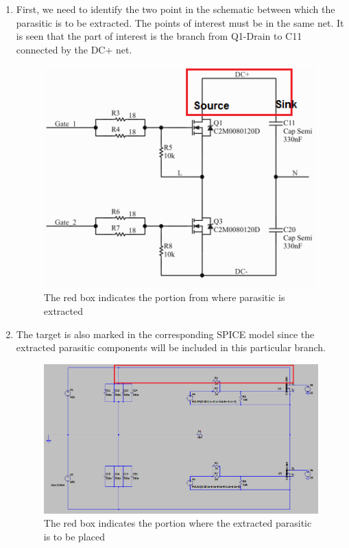 \begin{enumerate}
\item  First, we need to identify the two point in the schematic between which the parasitic is to be extracted. The points of interest must be in the same net. It is seen that the part of interest is the branch from Q1-Drain to C11 connected by the DC+ net.

\begin{figure} [H]
  \centering
  \includegraphics[width=\linewidth]{pictures/examples/Schematic1.png}
  \caption{The red box indicates the portion from where parasitic is extracted}
  \label{fig:schematic1}
\end{figure}

\item  The target is also marked in the corresponding SPICE model since the extracted parasitic components will be included in this particular branch.

\begin{figure} [H]
  \centering
  \includegraphics[width=\linewidth]{pictures/examples/spice1.png}
  \caption{The red box indicates the portion where the extracted parasitic is to be placed}
  \label{fig:spice1}
\end{figure}


\end{enumerate}
